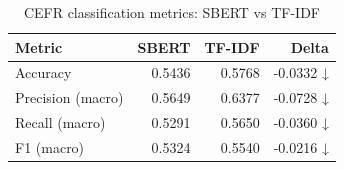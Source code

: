 \begin{table}[htbp]
\centering
\caption{CEFR classification metrics: SBERT vs TF-IDF}
\label{tab:classification_metrics}
\begin{tabular}{lrrr}
\toprule
Metric & SBERT & TF-IDF & Delta \\
\midrule
Accuracy & 0.5436 & 0.5768 & -0.0332 ↓ \\
Precision (macro) & 0.5649 & 0.6377 & -0.0728 ↓ \\
Recall (macro) & 0.5291 & 0.5650 & -0.0360 ↓ \\
F1 (macro) & 0.5324 & 0.5540 & -0.0216 ↓ \\
\bottomrule
\end{tabular}
\end{table}
